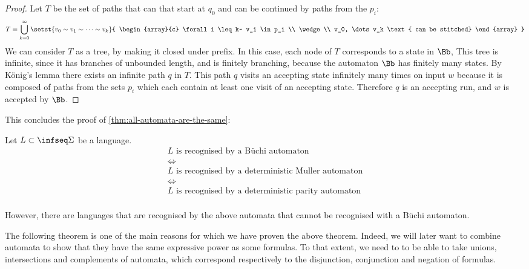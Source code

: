 \begin{proof}
    Let $T$ be the set of paths that can that start at $q_0$
    and can be continued by paths from the $p_i$:
    \[
        T = \bigcup_{k=0}^{\infty} \setst{
                v_0 \sim v_1 \sim \dots \sim v_k
            }{
                \begin{array}{c}
                    \forall i \leq k~
                    v_i \in p_i \\
                    \wedge \\
                    v_0, \dots v_k
                    \text{ can be stitched}
                \end{array}
            }
    \]
    We can consider $T$ as a tree, by making it closed under prefix.
    In this case, each node of $T$ corresponds to a state in $\Bb$,
    This tree is infinite,
    since it has branches of unbounded length, and is finitely branching,
    because the automaton $\Bb$ has finitely many states.
    By König's lemma there exists an infinite path $q$ in $T$.
    This path $q$ visits an accepting state infinitely many times
    on input $w$ because it is composed of paths from the sets $p_i$
    which each contain at least one visit of an accepting state.
    Therefore $q$ is an accepting run, and $w$ is accepted by $\Bb$.
\end{proof}

This concludes the proof of \autoref{thm:all-automata-are-the-same}:

\begin{theorem*}[\ref{thm:all-automata-are-the-same}]
    Let $L \subset \infseq\Sigma$ be a language.
    \[
        \begin{array}{c}
        L \text{ is recognised by a Büchi automaton} \\
        \iff \\
        L \text{ is recognised by a deterministic Muller automaton} \\
        \iff \\
        L \text{ is recognised by a deterministic parity automaton} \\
        \end{array}
    \]

    However, there are languages that are recognised by the above
    automata that cannot be recognised with a Büchi automaton.
\end{theorem*}

The following theorem is one of the main reasons for which we have
proven the above theorem. Indeed, we will later want to combine
automata to show that they have the same expressive power as
some formulas. To that extent, we need to to be able to take
unions, intersections and complements of automata, which
correspond respectively to the disjunction, conjunction and negation of
formulas.

